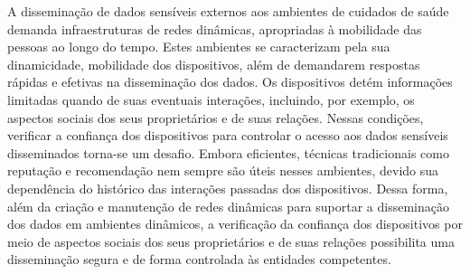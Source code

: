 \documentclass[12pt]{article}
\newcommand{\as}[1]{\textcolor{blue}{{\bf #1}}}
\newcommand{\agn}[1]{\textcolor{auburn}{#1}}
\begin{document}
\agn{A disseminação de dados sensíveis externos aos ambientes de cuidados de saúde demanda infraestruturas de redes dinâmicas, apropriadas à mobilidade das pessoas ao longo do tempo. Estes ambientes se caracterizam pela sua dinamicidade, mobilidade dos dispositivos, além de demandarem respostas rápidas e efetivas na disseminação dos dados. Os dispositivos detém informações limitadas quando de suas eventuais interações, incluindo, por exemplo, os aspectos sociais dos seus proprietários e de suas relações. Nessas condições, verificar a confiança dos dispositivos para controlar o acesso aos dados sensíveis disseminados torna-se um desafio. Embora eficientes, técnicas tradicionais como reputação e recomendação nem sempre são úteis nesses ambientes, devido sua dependência do histórico das interações passadas dos dispositivos. Dessa forma, além da criação e manutenção de redes dinâmicas para suportar a disseminação dos dados em ambientes dinâmicos, a verificação da confiança dos dispositivos por meio de aspectos sociais dos seus proprietários e de suas relações possibilita uma disseminação segura e de forma controlada às entidades competentes.}

\end{document}
